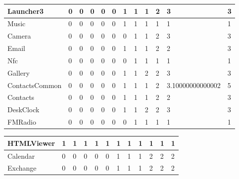 \documentclass[a4paper]{article}
\begin{document}
\begin{tabular}{|l|l|l|l|l|l|l|l|l|l|l|l|}
\hline
Launcher3&0&0&0&0&0&1&1&1&2&3&3\\
\hline
Music&0&0&0&0&0&1&1&1&1&1&1\\
\hline
Camera&0&0&0&0&0&0&1&1&2&3&3\\
\hline
Email&0&0&0&0&0&1&1&1&2&2&3\\
\hline
Nfc&0&0&0&0&0&0&1&1&1&1&1\\
\hline
Gallery&0&0&0&0&0&1&1&2&2&3&3\\
\hline
ContactsCommon&0&0&0&0&0&1&1&1&2&3.10000000000002&5\\
\hline
Contacts&0&0&0&0&0&1&1&1&2&2&3\\
\hline
DeskClock&0&0&0&0&0&1&1&2&2&3&3\\
\hline
FMRadio&0&0&0&0&0&0&1&1&1&1&1\\
\hline
\end{tabular}
\newline
\begin{tabular}{|l|l|l|l|l|l|l|l|l|l|l|l|}
\hline
HTMLViewer&1&1&1&1&1&1&1&1&1&1&1\\
\hline
Calendar&0&0&0&0&0&1&1&1&2&2&2\\
\hline
Exchange&0&0&0&0&0&1&1&1&2&2&2\\
\hline
\end{tabular}
\end{document}
